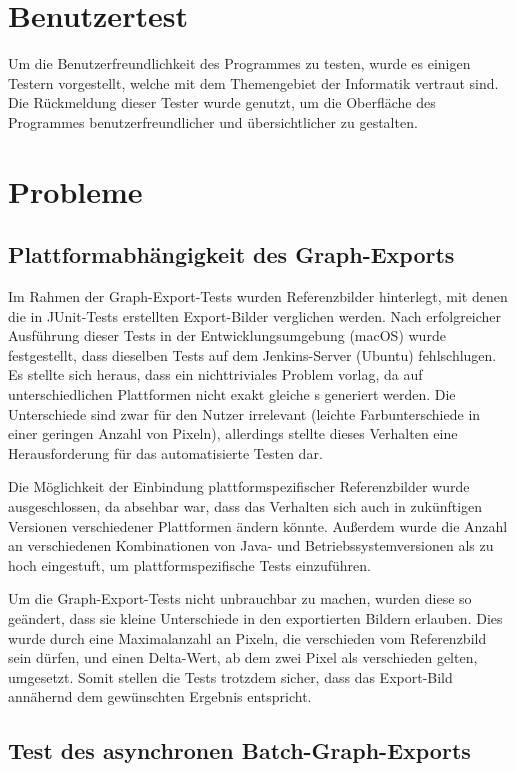 \section{Benutzertest}
Um die Benutzerfreundlichkeit des Programmes zu testen, wurde es einigen Testern vorgestellt, welche mit dem Themengebiet der Informatik vertraut sind. 
Die Rückmeldung dieser Tester wurde genutzt, um die Oberfläche des Programmes benutzerfreundlicher und übersichtlicher zu gestalten.

\newpage
\section{Probleme}

\subsection{Plattformabhängigkeit des Graph-Exports}

Im Rahmen der Graph-Export-Tests wurden Referenzbilder hinterlegt, mit denen die in JUnit-Tests erstellten Export-Bilder verglichen werden.
Nach erfolgreicher Ausführung dieser Tests in der Entwicklungsumgebung (macOS) wurde festgestellt, dass dieselben Tests auf dem Jenkins-Server (Ubuntu) fehlschlugen.
Es stellte sich heraus, dass ein nichttriviales Problem vorlag, da auf unterschiedlichen Plattformen nicht exakt gleiche s generiert werden.
Die Unterschiede sind zwar für den Nutzer irrelevant (leichte Farbunterschiede in einer geringen Anzahl von Pixeln), allerdings stellte dieses Verhalten eine Herausforderung für das automatisierte Testen dar.

Die Möglichkeit der Einbindung plattformspezifischer Referenzbilder wurde ausgeschlossen, da absehbar war, dass das Verhalten sich auch in zukünftigen Versionen verschiedener Plattformen ändern könnte.
Außerdem wurde die Anzahl an verschiedenen Kombinationen von Java- und Betriebssystemversionen als zu hoch eingestuft, um plattformspezifische Tests einzuführen.

Um die Graph-Export-Tests nicht unbrauchbar zu machen, wurden diese so geändert, dass sie kleine Unterschiede in den exportierten Bildern erlauben.
Dies wurde durch eine Maximalanzahl an Pixeln, die verschieden vom Referenzbild sein dürfen, und einen Delta-Wert, ab dem zwei Pixel als verschieden gelten, umgesetzt.
Somit stellen die Tests trotzdem sicher, dass das Export-Bild annähernd dem gewünschten Ergebnis entspricht.

\subsection{Test des asynchronen Batch-Graph-Exports}

